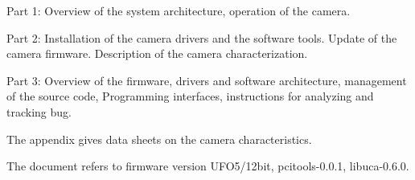 \documentclass[12pt,a4paper,twoside]{book}
\begin{document}
Part 1: Overview of the system architecture, operation of the camera. 

Part 2: Installation of the camera drivers and the software tools. Update of the camera firmware.
Description of the camera characterization.

Part 3: Overview of the firmware, drivers and software architecture, management of the source code,
Programming interfaces, instructions for analyzing and tracking bug. 

The appendix gives data sheets on the camera characteristics.

The document refers to firmware version UFO5/12bit, pcitools-0.0.1, libuca-0.6.0.









{}

\end{document}
